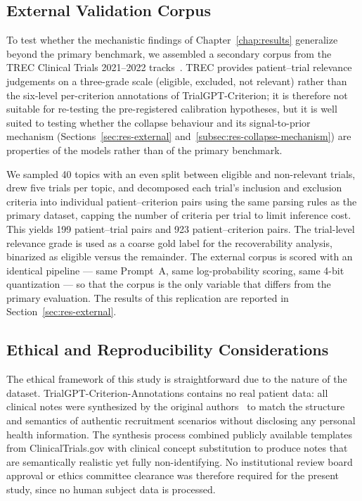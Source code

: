 \subsection{External Validation Corpus}
\label{subsec:met-data-external}

To test whether the mechanistic findings of Chapter~\ref{chap:results} 
generalize beyond the primary benchmark, we assembled a secondary corpus 
from the TREC Clinical Trials 2021--2022 tracks~\cite{roberts2021trec, roberts2022trec}. TREC provides 
patient--trial relevance judgements on a three-grade scale 
(eligible, excluded, not relevant) rather than the six-level 
per-criterion annotations of TrialGPT-Criterion; it is therefore not 
suitable for re-testing the pre-registered calibration hypotheses, but 
it is well suited to testing whether the collapse behaviour and its 
signal-to-prior mechanism (Sections~\ref{sec:res-external} 
and~\ref{subsec:res-collapse-mechanism}) are properties of the models 
rather than of the primary benchmark.

We sampled 40 topics with an even split between eligible and 
non-relevant trials, drew five trials per topic, and decomposed each 
trial's inclusion and exclusion criteria into individual 
patient--criterion pairs using the same parsing rules as the primary 
dataset, capping the number of criteria per trial to limit inference 
cost. This yields 199 patient--trial pairs and 923 patient--criterion 
pairs. The trial-level relevance grade is used as a coarse gold label 
for the recoverability analysis, binarized as eligible versus the 
remainder. The external corpus is scored with an identical pipeline --- 
same Prompt~A, same log-probability scoring, same 4-bit quantization --- 
so that the corpus is the only variable that differs from the primary 
evaluation. The results of this replication are reported in 
Section~\ref{sec:res-external}.

\subsection{Ethical and Reproducibility Considerations}
\label{subsec:met-data-ethics}

The ethical framework of this study is straightforward due to the nature 
of the dataset. TrialGPT-Criterion-Annotations contains no real patient 
data: all clinical notes were synthesized by the original 
authors~\cite{jin2024trialgpt} to match the structure and semantics of 
authentic recruitment scenarios without disclosing any personal health 
information. The synthesis process combined publicly available templates 
from ClinicalTrials.gov with clinical concept substitution to produce 
notes that are semantically realistic yet fully non-identifying. No 
institutional review board approval or ethics committee clearance was 
therefore required for the present study, since no human subject data is 
processed.

